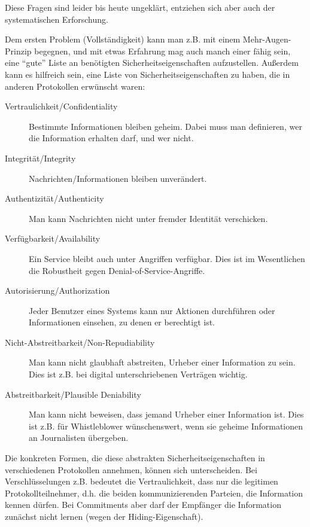 Diese Fragen sind leider bis heute ungeklärt, entziehen sich aber auch der systematischen Erforschung.

Dem ersten Problem (Vollständigkeit) kann man z.B. mit einem Mehr-Augen-Prinzip begegnen, und mit etwas Erfahrung mag auch manch einer fähig sein, eine "`gute"' Liste an benötigten Sicherheitseigenschaften aufzustellen.
Außerdem kann es hilfreich sein, eine Liste von Sicherheitseigenschaften zu haben, die in anderen Protokollen erwünscht waren:

\begin{description}
	\item[Vertraulichkeit/Confidentiality] Bestimmte Informationen bleiben geheim. Dabei muss man definieren, wer die Information erhalten darf, und wer nicht.
	\item[Integrität/Integrity] Nachrichten/Informationen bleiben unverändert.
	\item[Authentizität/Authenticity]
          Man kann Nachrichten nicht unter fremder Identität verschicken.
	\item[Verfügbarkeit/Availability]
           Ein Service bleibt auch unter Angriffen verfügbar. Dies ist im Wesentlichen die Robustheit gegen Denial-of-Service-Angriffe.
	\item[Autorisierung/Authorization]Jeder Benutzer eines Systems kann nur Aktionen durchführen oder Informationen einsehen, zu denen er berechtigt ist.
	\item[Nicht-Abstreitbarkeit/Non-Repudiability] Man kann nicht glaubhaft abstreiten, Urheber einer Information zu sein. Dies ist z.B. bei digital unterschriebenen Verträgen wichtig.
	\item[Abstreitbarkeit/Plausible Deniability]
          Man kann nicht beweisen, dass jemand Urheber einer Information ist. Dies ist z.B. für Whistleblower wünschenswert, wenn sie geheime Informationen an Journalisten übergeben.
\end{description}

Die konkreten Formen, die diese abstrakten Sicherheitseigenschaften in verschiedenen Protokollen annehmen, können sich unterscheiden.
Bei Verschlüsselungen z.B. bedeutet die Vertraulichkeit, dass nur die legitimen Protokollteilnehmer, d.h. die beiden kommunizierenden Parteien, die Information kennen dürfen.
Bei Commitments aber darf der Empfänger die Information zunächst nicht lernen (wegen der Hiding-Eigenschaft).

